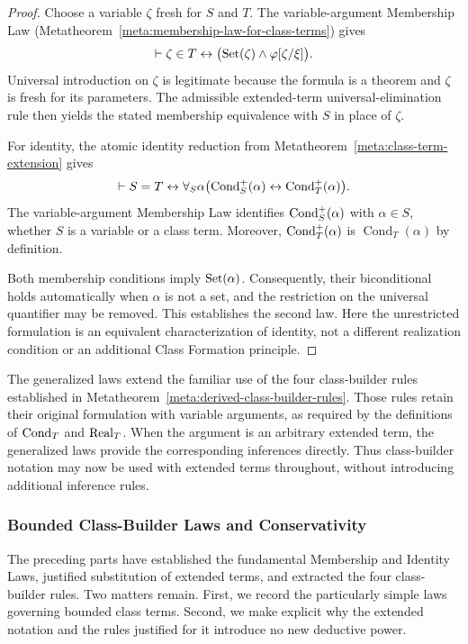 \begin{proof}
Choose a variable \(\zeta\) fresh for \(S\) and \(T\).
The variable-argument Membership Law
(Metatheorem~\ref{meta:membership-law-for-class-terms})
gives
\[
\vdash
\zeta\in T
\leftrightarrow
\bigl(\operatorname{Set}(\zeta)\land\varphi[\zeta/\xi]\bigr).
\]
Universal introduction on \(\zeta\) is legitimate
because the formula is a theorem and \(\zeta\) is
fresh for its parameters. The admissible extended-term
universal-elimination rule then yields the stated
membership equivalence with \(S\) in place of \(\zeta\).

For identity, the atomic identity reduction from
Metatheorem~\ref{meta:class-term-extension} gives
\[
\vdash
S=T
\leftrightarrow
\forall_S\alpha
\bigl(\operatorname{Cond}_S^+(\alpha)\leftrightarrow \operatorname{Cond}_T^{+}(\alpha)\bigr).
\]
The variable-argument Membership Law identifies
\(\operatorname{Cond}_S^+(\alpha)\) with \(\alpha\in S\), whether \(S\)
is a variable or a class term. Moreover,
\(\operatorname{Cond}_T^{+}(\alpha)\) is
\(\operatorname{Cond}_T(\alpha)\) by definition.

Both membership conditions imply \(\operatorname{Set}(\alpha)\).
Consequently, their biconditional holds automatically
when \(\alpha\) is not a set, and the restriction
on the universal quantifier may be removed. This
establishes the second law. Here the unrestricted formulation
is an equivalent characterization of identity, not a different
realization condition or an additional Class Formation principle.
\end{proof}

The generalized laws extend the familiar use of the four
class-builder rules established in
Metatheorem~\ref{meta:derived-class-builder-rules}.
Those rules retain their original formulation with variable
arguments, as required by the definitions of
\(\operatorname{Cond}_T\) and \(\operatorname{Real}_T\). When the argument is an
arbitrary extended term, the generalized laws provide
the corresponding inferences directly. Thus class-builder
notation may now be used with extended terms throughout,
without introducing additional inference rules.



\subsubsection{Bounded Class-Builder Laws and Conservativity}
\label{sec:bounded-builder-laws-and-conservativity}

The preceding parts have established the fundamental Membership and
Identity Laws, justified substitution of extended terms, and extracted
the four class-builder rules. Two matters remain. First, we record the
particularly simple laws governing bounded class terms. Second, we
make explicit why the extended notation and the rules justified for
it introduce no new deductive power.

